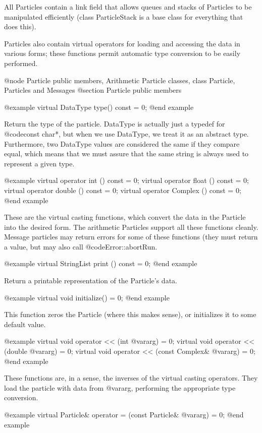 All Particles contain a link field that allows queues and stacks of
Particles to be manipulated efficiently (class ParticleStack is a base
class for everything that does this).

Particles also contain virtual operators for loading and accessing the
data in various forms; these functions permit automatic type conversion
to be easily performed.

@node Particle public members, Arithmetic Particle classes, class Particle, Particles and Messages
@section Particle public members

@example
virtual DataType type() const = 0;
@end example

Return the type of the particle.  DataType is actually just a typedef
for @code{const char*}, but when we use DataType, we treat it as an
abstract type.  Furthermore, two DataType values are considered the
same if they compare equal, which means that we must assure that
the same string is always used to represent a given type.

@example
virtual operator int () const = 0;
virtual operator float () const = 0;
virtual operator double () const = 0;
virtual operator Complex () const = 0;
@end example

These are the virtual casting functions, which convert the data in
the Particle into the desired form.  The arithmetic Particles support
all these functions cleanly.  Message particles may return errors for
some of these functions (they must return a value, but may also call
@code{Error::abortRun}.

@example
virtual StringList print () const = 0;
@end example

Return a printable representation of the Particle's data.

@example
virtual void initialize() = 0;
@end example

This function zeros the Particle (where this makes sense), or
initializes it to some default value.

@example
virtual void operator << (int @var{arg}) = 0;
virtual void operator << (double @var{arg}) = 0;
virtual void operator << (const Complex& @var{arg}) = 0;
@end example

These functions are, in a sense, the inverses of the virtual casting
operators.  They load the particle with data from @var{arg}, performing
the appropriate type conversion.

@example
virtual Particle& operator = (const Particle& @var{arg}) = 0;
@end example

